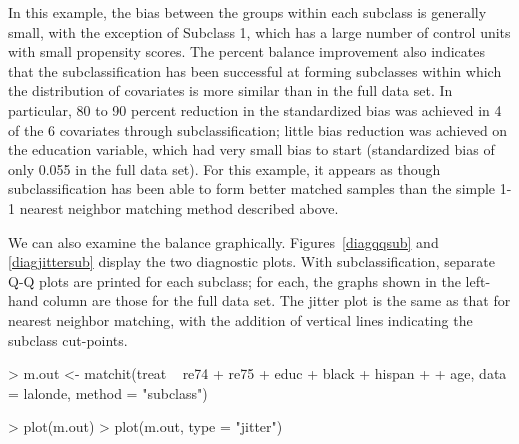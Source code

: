 \documentclass[oneside,letterpaper,titlepage]{article}
\begin{document}
\begin{enumerate}
In this example, the bias between the groups within each subclass is
generally small, with the exception of Subclass 1, which has a large
number of control units with small propensity scores.  The percent
balance improvement also indicates that the subclassification has been
successful at forming subclasses within which the distribution of
covariates is more similar than in the full data set.  In particular,
80 to 90 percent reduction in the standardized bias was achieved in 4
of the 6 covariates through subclassification; little bias reduction
was achieved on the education variable, which had very small bias to
start (standardized bias of only 0.055 in the full data set).  For
this example, it appears as though subclassification has been able to
form better matched samples than the simple 1-1 nearest neighbor
matching method described above.

We can also examine the balance graphically.  Figures~\ref{diagqqsub}
and \ref{diagjittersub} display the two diagnostic plots.  With
subclassification, separate Q-Q plots are printed for each subclass;
for each, the graphs shown in the left-hand column are those for the
full data set.  The jitter plot is the same as that for nearest
neighbor matching, with the addition of vertical lines indicating the
subclass cut-points.
\begin{Schunk}
\begin{Sinput}
> m.out <- matchit(treat ~ re74 + re75 + educ + black + hispan + 
+     age, data = lalonde, method = "subclass")
\end{Sinput}
\end{Schunk}
\begin{Schunk}
\begin{Sinput}
> plot(m.out)
> plot(m.out, type = "jitter")
\end{Sinput}
\end{Schunk}


\end{enumerate}
\end{document}
